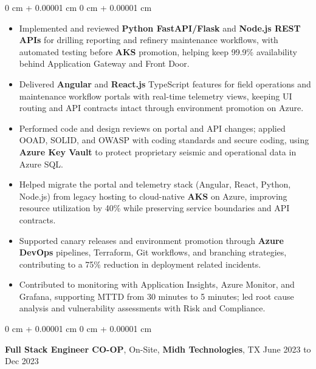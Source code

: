 \documentclass[10pt, letterpaper]{article}
\newenvironment{highlights}{
    \begin{itemize}[
        topsep=0.04 cm,
        parsep=0.04 cm,
        partopsep=0pt,
        itemsep=0pt,
        leftmargin=0 cm + 10pt
    ]
}{
    \end{itemize}
} %
\newenvironment{onecolentry}{
    \begin{adjustwidth}{
        0 cm + 0.00001 cm
    }{
        0 cm + 0.00001 cm
    }
}{
    \end{adjustwidth}
} %
\newcommand{\resumeheading}[2]{%
    \begin{onecolentry}
        #1 \hfill #2
    \end{onecolentry}
} %
\begin{document}
\begin{onecolentry}
\begin{highlights}
	\item Implemented and reviewed \textbf{Python FastAPI/Flask} and \textbf{Node.js REST APIs} for drilling reporting and refinery maintenance workflows, with automated testing before \textbf{AKS} promotion, helping keep 99.9\% availability behind Application Gateway and Front Door.
	\item Delivered \textbf{Angular} and \textbf{React.js} TypeScript features for field operations and maintenance workflow portals with real-time telemetry views, keeping UI routing and API contracts intact through environment promotion on Azure.
	\item Performed code and design reviews on portal and API changes; applied OOAD, SOLID, and OWASP with coding standards and secure coding, using \textbf{Azure Key Vault} to protect proprietary seismic and operational data in Azure SQL.
	\item Helped migrate the portal and telemetry stack (Angular, React, Python, Node.js) from legacy hosting to cloud-native \textbf{AKS} on Azure, improving resource utilization by 40\% while preserving service boundaries and API contracts.
	\item Supported canary releases and environment promotion through \textbf{Azure DevOps} pipelines, Terraform, Git workflows, and branching strategies, contributing to a 75\% reduction in deployment related incidents.
	\item Contributed to monitoring with Application Insights, Azure Monitor, and Grafana, supporting MTTD from 30 minutes to 5 minutes; led root cause analysis and vulnerability assessments with Risk and Compliance.
\end{highlights}
\end{onecolentry}



\vspace{0.15 cm}
\resumeheading{\textbf{Full Stack Engineer CO-OP}, On-Site, \textbf{Midh Technologies}, TX}{June 2023 to Dec 2023}
\end{document}
